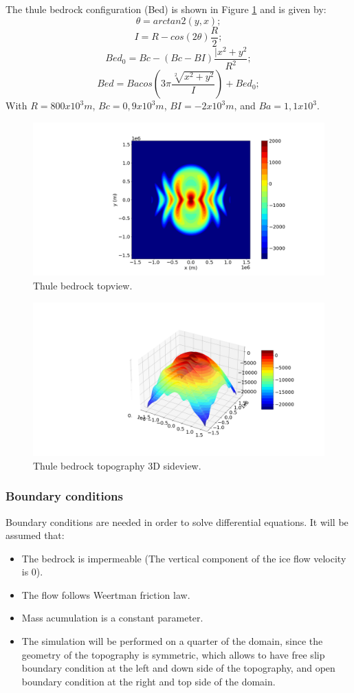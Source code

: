 \documentclass[a4paper,12pt]{article}
\begin{document}
The thule bedrock configuration (Bed) is shown in Figure \ref{Thule_2D} and is given by:
\begin{equation}
	\theta=arctan2(y,x);
\end{equation}
\begin{equation}
	I=R-cos(2\theta)\frac{R}{2};
\end{equation}
\begin{equation}
	Bed_0=Bc-(Bc-BI)\frac{|x^2+y^2}{R^2};
\end{equation}
\begin{equation}
	Bed=Bacos(3\pi\frac{\sqrt[2]{x^2+y^2}}{I})+Bed_0;
\end{equation}
With $R=800 x 10^3 m$, $Bc=0,9 x 10^3 m$, $BI=-2 x 10^3 m$, and $Ba=1,1 x 10^3$.
\begin{figure}[!h]
	\centering
	\includegraphics[width=0.7\linewidth]{../fig/Thule_2D}
	\caption{Thule bedrock topview.}
	\label{Thule_2D}
\end{figure}
\begin{figure}[!h]
	\centering
	\includegraphics[width=0.7\linewidth]{../fig/Thule_3D}
	\caption{Thule bedrock topography 3D sideview.}
	\label{Thule_3D}
\end{figure}
\subsubsection{Boundary conditions}
Boundary conditions are needed in order to solve differential equations. It will be assumed that:
\begin{itemize}
	\item The bedrock is impermeable (The vertical component of the ice flow velocity is 0). 
	\item The flow follows Weertman friction law.
	\item Mass acumulation is a constant parameter.
	\item The simulation will be performed on a quarter of the domain, since the geometry of the topography is symmetric, which allows to have free slip boundary condition at the left and down side of the topography, and open boundary condition at the right and top side of the domain. 
\end{itemize}
\end{document}
